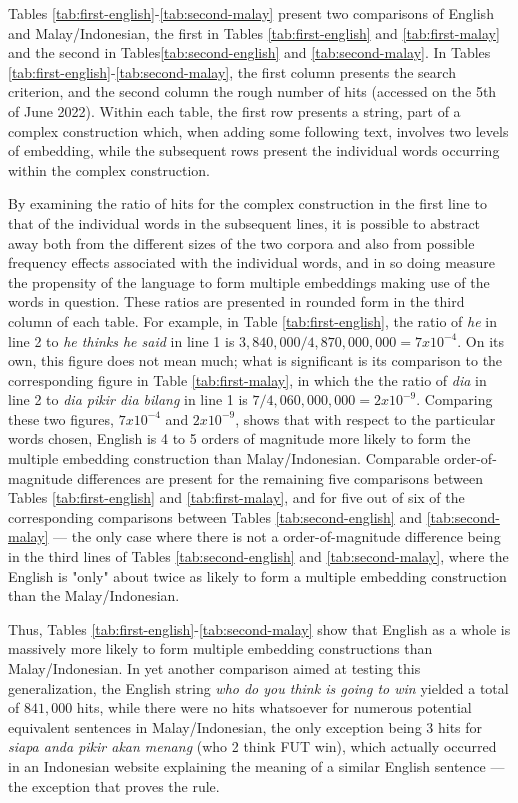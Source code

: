 \documentclass[output=paper,colorlinks,citecolor=brown
]{langscibook}
\begin{document}
Tables \ref{tab:first-english}-\ref{tab:second-malay} present two comparisons of English and Malay/Indonesian, the first in Tables \ref{tab:first-english} and \ref{tab:first-malay} and the second in Tables\ref{tab:second-english} and \ref{tab:second-malay}.  In Tables \ref{tab:first-english}-\ref{tab:second-malay}, the first column presents the search criterion, and the second column the rough number of hits (accessed on the 5th of June 2022).  Within each table, the first row presents a string, part of a complex construction which, when adding some following text, involves two levels of embedding, while the subsequent rows present the individual words occurring within the complex construction.

By examining the ratio of hits for the complex construction in the first line to that of the individual words in the subsequent lines, it is possible to abstract away both from the different sizes of the two corpora and also from possible frequency effects associated with the individual words, and in so doing measure the propensity of the language to form multiple embeddings making use of the words in question.  These ratios are presented in rounded form in the third column of each table.  For example, in Table \ref{tab:first-english}, the ratio of \emph{he} in line 2 to \emph{he thinks he said} in line 1 is $3,840,000 / 4,870,000,000 = 7 x 10^{-4}$.  On its own, this figure does not mean much; what is significant is its comparison to the corresponding figure in Table \ref{tab:first-malay}, in which the the ratio of \emph{dia} in line 2 to \emph{dia pikir dia bilang} in line 1 is $7 / 4,060,000,000 = 2 x 10^{-9}$.  Comparing these two figures, $7 x 10^{-4}$ and $2 x 10^{-9}$, shows that with respect to the particular words chosen, English is 4 to 5 orders of magnitude more likely to form the multiple embedding construction than Malay/Indonesian.  Comparable order-of-magnitude differences are present for the remaining five comparisons between Tables \ref{tab:first-english} and \ref{tab:first-malay}, and for five out of six of the corresponding comparisons between Tables \ref{tab:second-english} and \ref{tab:second-malay} — the only case where there is not a order-of-magnitude difference being in the third lines of Tables \ref{tab:second-english} and \ref{tab:second-malay}, where the English is "only" about twice as likely to form a multiple embedding construction than the Malay/Indonesian.

Thus, Tables \ref{tab:first-english}-\ref{tab:second-malay} show that English as a whole is massively more likely to form multiple embedding constructions than Malay/Indonesian.  In yet another comparison aimed at testing this generalization, the English string \emph{who do you think is going to win} yielded a total of $841,000$ hits, while there were no hits whatsoever for numerous potential equivalent sentences in Malay/Indonesian, the only exception being 3 hits for \emph{siapa anda pikir akan menang} (who 2 think FUT win), which actually occurred in an Indonesian website explaining the meaning of a similar English sentence — the exception that proves the rule.
\end{document}
